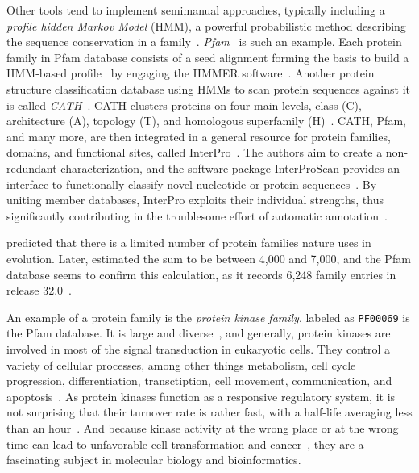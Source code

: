   Other tools tend to implement semimanual approaches, typically including a
  \emph{profile hidden Markov Model} (HMM), a powerful probabilistic method describing the
  sequence conservation in a family~\cite{krogh1994hidden, eddy1996hidden}.
  \emph{Pfam}~\cite{sonnhammer1997pfam} is such an example.
  Each protein family in Pfam database consists of a seed alignment forming the basis to
  build a HMM-based profile~\cite{el2019pfam} by engaging the HMMER
  software~\cite{finn2010pfam, finn2011hmmer}.
  Another protein structure classification database using HMMs to scan protein sequences
  against it is called \emph{CATH}~\cite{dawson2017cath}.
  CATH clusters proteins on four main levels, class (C), architecture (A), topology (T),
  and homologous superfamily (H)~\cite{orengo1997cath}.
  CATH, Pfam, and many more, are then integrated in a general resource for protein
  families, domains, and functional sites, called InterPro~\cite{finn2017interpro}.
  The authors aim to create a non-redundant characterization, and the software package
  InterProScan provides an interface to functionally classify novel nucleotide or protein
  sequences~\cite{zdobnov2001interproscan}.
  By uniting member databases, InterPro exploits their individual strengths, thus
  significantly contributing in the troublesome effort of automatic
  annotation~\cite{apweiler2000interpro}.

  \citet{chothia1992one} predicted that there is a limited number of protein families
  nature uses in evolution.
  Later, \citet{wolf2000estimating} estimated the sum to be between 4,000 and 7,000, and
  the Pfam database seems to confirm this calculation, as it records 6,248 family entries
  in release 32.0~\cite{el2019pfam}.

\label{intro:pkinase}

  An example of a protein family is the \emph{protein kinase family}, labeled as
  \texttt{PF00069} is the Pfam database.
  It is large and diverse~\cite{hanks1988protein, hunter19911}, and generally, protein
  kinases are involved in most of the signal transduction in eukaryotic cells.
  They control a variety of cellular processes, among other things metabolism, cell cycle
  progression, differentiation, transctiption, cell movement, communication, and
  apoptosis~\cite{kemp2003amp, matsuoka1998linkage, johnson1994sequential,
  vermeulen2003transcriptional, chen1994cell, warn1998regulation, cross2000serine}.
  As protein kinases function as a responsive regulatory system, it is not surprising that
  their turnover rate is rather fast, with a half-life averaging less than an
  hour~\cite{hunter1982phosphotyrosine}.
  And because kinase activity at the wrong place or at the wrong time can lead to
  unfavorable cell transformation and cancer~\cite{koivunen2006protein,
  caretta2011protein}, they are a fascinating subject in molecular biology and
  bioinformatics.

